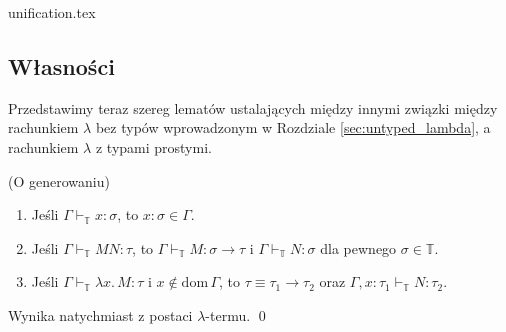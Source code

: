 {unification.tex}

\subsection{Własności}

Przedstawimy teraz szereg lematów ustalających między innymi związki między rachunkiem \(\lambda\) bez typów wprowadzonym w Rozdziale \ref{sec:untyped_lambda}, a rachunkiem \(\lambda\) z typami prostymi.

\begin{lemat}(O generowaniu)\label{thm:generation}
  \begin{enumerate}[label=(\arabic*)]
     \setlength\itemsep{0em}
     \item Jeśli \(\Gamma\vdash_{\mathbb{T}} x:\sigma\), to \(x:\sigma\in\Gamma\).\label{thm:generation_1}
     \item Jeśli \(\Gamma\vdash_{\mathbb{T}}MN:\tau\), to \(\Gamma\vdash_\mathbb{T} M:\sigma\to\tau\) i \(\Gamma\vdash_\mathbb{T} N:\sigma\) dla pewnego \(\sigma\in\mathbb{T}\).\label{thm:generation_2}
     \item Jeśli \(\Gamma\vdash_{\mathbb{T}}\lambda x.\, M:\tau\) i \(x\not\in\mathrm{dom}\,\Gamma\), to \(\tau\equiv \tau_1\to\tau_2\) oraz \(\Gamma,x:\tau_1\vdash_\mathbb{T} N:\tau_2\). \label{thm:generation_3}
  \end{enumerate} 
\end{lemat}
\begin{dowod}
  Wynika natychmiast z postaci \(\lambda\)-termu.  \qed
\end{dowod}

